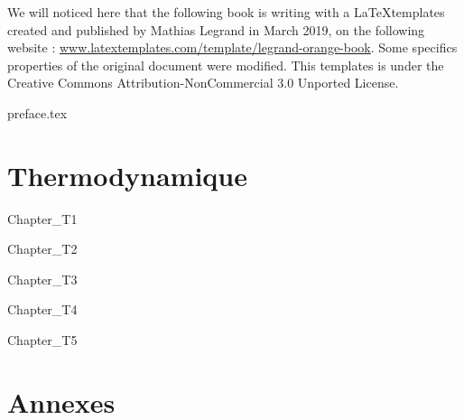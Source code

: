 \documentclass[11pt,fleqn]{book} %
\begin{document}
\noindent We will noticed here that the following book is writing with a \LaTeX  templates created and published by Mathias Legrand in March 2019, on the following website : \url{www.latextemplates.com/template/legrand-orange-book}. Some specifics properties of the original document were modified. This templates is under the Creative Commons Attribution-NonCommercial 3.0 Unported License.




\pagestyle{empty} %

\tableofcontents %

\cleardoublepage %

\pagestyle{fancy} %


{preface.tex}

\part{Thermodynamique}

{Chapter_T1}


{Chapter_T2}


{Chapter_T3}


{Chapter_T4}


{Chapter_T5}

\appendix
\part{Annexes}
\end{document}
